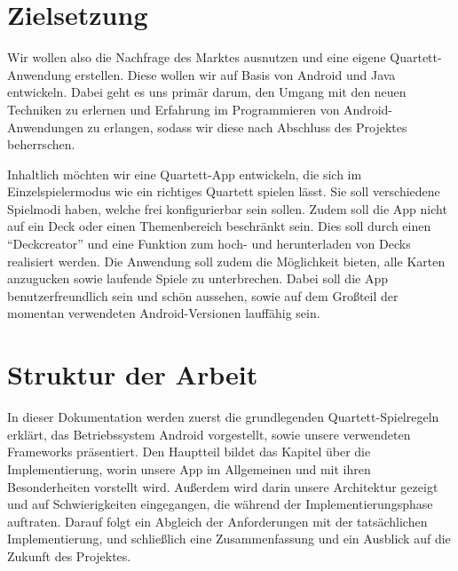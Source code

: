 \section{Zielsetzung}
\label{sec:einleitung:zielsetzung}

Wir wollen also die Nachfrage des Marktes ausnutzen und eine eigene Quartett-Anwendung erstellen. Diese wollen wir auf Basis von Android und Java entwickeln. Dabei geht es uns primär darum, den Umgang mit den neuen Techniken zu erlernen und Erfahrung im Programmieren von Android-Anwendungen zu erlangen, sodass wir diese nach Abschluss des Projektes beherrschen.

Inhaltlich möchten wir eine Quartett-App entwickeln, die sich im Einzelspielermodus wie ein richtiges Quartett spielen lässt. Sie soll verschiedene Spielmodi haben, welche frei konfigurierbar sein sollen. Zudem soll die App nicht auf ein Deck oder einen Themenbereich beschränkt sein. Dies soll durch einen ``Deckcreator'' und eine Funktion zum hoch- und herunterladen von Decks realisiert werden. Die Anwendung soll zudem die Möglichkeit bieten, alle Karten anzugucken sowie laufende Spiele zu unterbrechen. Dabei soll die App benutzerfreundlich sein und schön aussehen, sowie auf dem Großteil der momentan verwendeten Android-Versionen lauffähig sein.

\section{Struktur der Arbeit}
\label{sec:einleitung:struktur}

In dieser Dokumentation werden zuerst die grundlegenden Quartett-Spielregeln erklärt, das Betriebssystem Android vorgestellt, sowie unsere verwendeten Frameworks präsentiert. Den Hauptteil bildet das Kapitel über die Implementierung, worin unsere App im Allgemeinen und mit ihren Besonderheiten vorstellt wird. Außerdem wird darin unsere Architektur gezeigt und auf Schwierigkeiten eingegangen, die während der Implementierungsphase auftraten. Darauf folgt ein Abgleich der Anforderungen mit der tatsächlichen Implementierung, und schließlich eine Zusammenfassung und ein Ausblick auf die Zukunft des Projektes.\\
